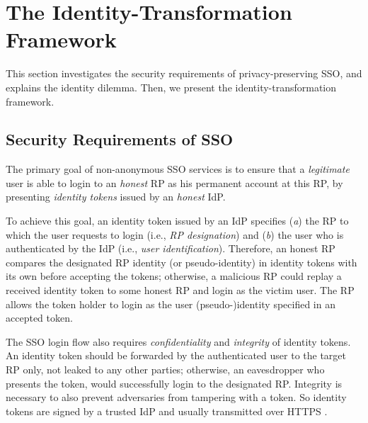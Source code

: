 \section{The Identity-Transformation Framework}
\label{sec:challenge}

This section investigates the security requirements of privacy-preserving SSO,
    and explains the identity dilemma.
Then,
    we present the identity-transformation framework.


\subsection{Security Requirements of SSO}
\label{subsec:basicrequirements}

The primary goal of non-anonymous SSO services \cite{OpenIDConnect,rfc6749,SAML,SAMLIdentifier,NIST2017draft} is %
 to ensure that a \emph{legitimate} user is able to login to an \emph{honest} RP as his permanent account at this RP, %
    by presenting \emph{identity tokens} issued by an \emph{honest} IdP.

To achieve this goal,
 an identity token issued by an IdP \cite{OpenIDConnect,rfc6749,SAML,SAMLIdentifier,NIST2017draft} specifies (\emph{a}) the RP to which the user requests to login (i.e., \emph{RP designation})
    and  (\emph{b}) the user who is authenticated by the IdP (i.e., \emph{user identification}).
Therefore,
    an honest RP compares the designated RP identity (or pseudo-identity) in identity tokens with its own before accepting the tokens;
     otherwise,
        a malicious RP could replay a received identity token to some honest RP and login as the victim user.
The RP allows the token holder to login as the user (pseudo-)identity specified in an accepted token.

The SSO login flow also requires \emph{confidentiality} and \emph{integrity} of identity tokens.
An identity token should be forwarded by the authenticated user to the target RP only,
    not leaked to any other parties;
        otherwise, an eavesdropper who presents the token, would successfully login to the designated RP.
Integrity is necessary
    to also prevent adversaries from tampering with a token.
So identity tokens are signed by a trusted IdP and usually transmitted over HTTPS \cite{OpenIDConnect,rfc6749,SAML}.

